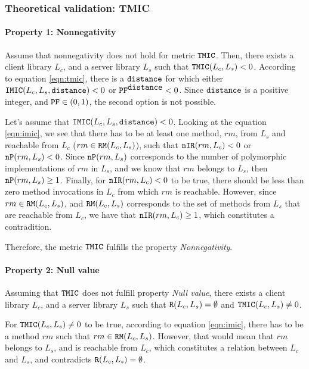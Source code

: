 \subsubsection{Theoretical validation: TMIC}

\paragraph{Property 1: Nonnegativity}
Assume that nonnegativity does not hold for metric $\verb|TMIC|$. Then, there exists a client library $L_c$, and a server library $L_s$ such that $\verb|TMIC|(L_c, L_s) < 0$. According to equation \ref{eqn:tmic}, there is a $\verb|distance|$ for which either $\verb|IMIC|(L_c,L_s, \verb|distance|) < 0$ or $\verb|PF|^{\verb|distance|} < 0$. Since $\verb|distance|$ is a positive integer, and $\verb|PF| \in (0,1)$, the second option is not possible.

Let's assume that $\verb|IMIC|(L_c,L_s, \verb|distance|) < 0$. Looking at the equation \ref{eqn:imic}, we see that there has to be at least one method, $rm$, from $L_s$ and reachable from $L_c$ ($rm \in \verb|RM|(L_c,L_s)$), such that $\verb|nIR|(rm,L_c) < 0$ or $\verb|nP|(rm, L_s) < 0$. Since $\verb|nP|(rm, L_s)$ corresponds to the number of polymorphic implementations of $rm$ in $L_s$, and we know that $rm$ belongs to $L_s$, then $\verb|nP|(rm, L_s) \geq 1$. Finally, for $\verb|nIR|(rm,L_c) < 0$ to be true, there should be less than zero method invocations in $L_c$ from which $rm$ is reachable. However, since $rm \in \verb|RM|(L_c,L_s)$, and $\verb|RM|(L_c,L_s)$ corresponds to the set of methods from $L_s$ that are reachable from $L_c$, we have that $\verb|nIR|(rm,L_c) \geq 1$, which constitutes a contradition.

Therefore, the metric $\verb|TMIC|$ fulfills the property \textit{Nonnegativity}.

\paragraph{Property 2: Null value}
Assuming that $\verb|TMIC|$ does not fulfill property \textit{Null value}, there exists a client library $L_c$, and a server library $L_s$ such that $\verb|R|(L_c, L_s) = \emptyset$ and $\verb|TMIC|(L_c, L_s) \neq 0$.

For $\verb|TMIC|(L_c, L_s) \neq 0$ to be true, according to equation \ref{eqn:imic}, there has to be a method $rm$ such that  $rm \in \verb|RM|(L_c,L_s)$. However, that would mean that $rm$ belongs to $L_s$, and is reachable from $L_c$, which constitutes a relation between $L_c$ and $L_s$, and contradicts $\verb|R|(L_c, L_s) = \emptyset$.

